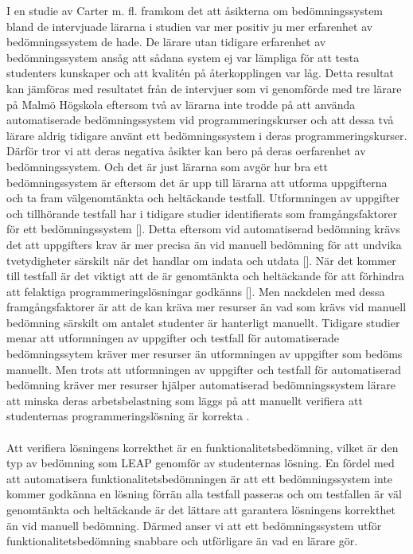 \documentclass[a4paper,11pt]{article}
\begin{document}
{I en studie av Carter m. fl. \cite{carter} framkom det att åsikterna om bedömningssystem bland de intervjuade lärarna i studien var mer positiv ju mer erfarenhet av bedömningssystem de hade. De lärare utan tidigare erfarenhet av bedömningssystem ansåg att sådana system ej var lämpliga för att testa studenters kunskaper och att kvalitén på återkopplingen var låg. Detta resultat kan jämföras med resultatet från de intervjuer som vi genomförde med tre lärare på Malmö Högskola eftersom två av lärarna inte trodde på att använda automatiserade bedömningssystem vid programmeringskurser och att dessa två lärare aldrig tidigare använt ett bedömningssystem i deras programmeringskurser. Därför tror vi att deras negativa åsikter kan bero på deras oerfarenhet av bedömningssystem. Och det är just lärarna som avgör hur bra ett bedömningssystem är eftersom det är upp till lärarna att utforma uppgifterna och ta fram välgenomtänkta och heltäckande testfall. Utformningen av uppgifter och tillhörande testfall har i tidigare studier identifierats som framgångsfaktorer för ett bedömningssystem []. Detta eftersom vid automatiserad bedömning krävs det att uppgifters krav är mer precisa än vid manuell bedömning för att undvika tvetydigheter särskilt när det handlar om indata och utdata []. När det kommer till testfall är det viktigt att de är genomtänkta och heltäckande för att förhindra att felaktiga programmeringslösningar godkänns []. Men nackdelen med dessa framgångsfaktorer är att de kan kräva mer resurser än vad som krävs vid manuell bedömning särskilt om antalet studenter är hanterligt manuellt. Tidigare studier \cite{ala-mutka} \cite{cinelli} menar att utformningen av uppgifter och testfall för automatiserade bedömningssytem kräver mer resurser än utformningen av uppgifter som bedöms manuellt. Men trots att utformningen av uppgifter och testfall för automatiserad bedömning kräver mer resurser hjälper automatiserad bedömningssystem lärare att minska deras arbetsbelastning som läggs på att manuellt verifiera att studenternas programmeringslösning är korrekta \cite{enstrom}.
\\
\\
Att verifiera lösningens korrekthet är en funktionalitetsbedömning, vilket är den typ av bedömning som LEAP genomför av studenternas lösning. En fördel med att automatisera funktionalitetsbedömningen är att ett bedömningssystem inte kommer godkänna en lösning förrän alla testfall passeras och om testfallen är väl genomtänkta och heltäckande är det lättare att garantera lösningens korrekthet än vid manuell bedömning. Därmed anser vi att ett bedömningssystem utför funktionalitetsbedömning snabbare och utförligare än vad en lärare gör.
}
\end{document}
